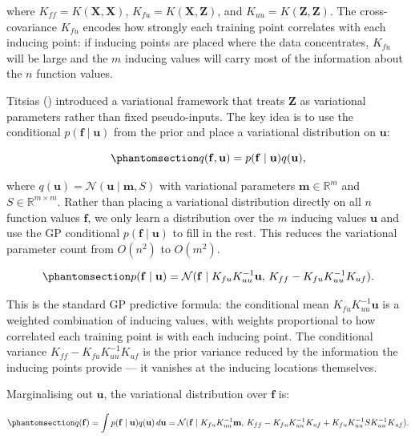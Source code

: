 \documentclass[
  letterpaper,
  DIV=11,
  numbers=noendperiod]{scrartcl}
\begin{document}
where \(K_{ff} = K(\mathbf{X}, \mathbf{X})\),
\(K_{fu} = K(\mathbf{X}, \mathbf{Z})\), and
\(K_{uu} = K(\mathbf{Z}, \mathbf{Z})\). The cross-covariance \(K_{fu}\)
encodes how strongly each training point correlates with each inducing
point: if inducing points are placed where the data concentrates,
\(K_{fu}\) will be large and the \(m\) inducing values will carry most
of the information about the \(n\) function values.

Titsias () introduced a
variational framework that treats \(\mathbf{Z}\) as variational
parameters rather than fixed pseudo-inputs. The key idea is to use the
conditional \(p(\mathbf{f} \mid \mathbf{u})\) from the prior and place a
variational distribution on \(\mathbf{u}\):

\begin{equation}\phantomsection\label{eq-sparse_variational_form}{
q(\mathbf{f}, \mathbf{u}) = p(\mathbf{f} \mid \mathbf{u}) q(\mathbf{u}),
}\end{equation}

where \(q(\mathbf{u}) = \mathcal{N}(\mathbf{u} \mid \mathbf{m}, S)\)
with variational parameters \(\mathbf{m} \in \mathbb{R}^m\) and
\(S \in \mathbb{R}^{m \times m}\). Rather than placing a variational
distribution directly on all \(n\) function values \(\mathbf{f}\), we
only learn a distribution over the \(m\) inducing values \(\mathbf{u}\)
and use the GP conditional \(p(\mathbf{f} \mid \mathbf{u})\) to fill in
the rest. This reduces the variational parameter count from \(O(n^2)\)
to \(O(m^2)\).

\begin{equation}\phantomsection\label{eq-conditional_f_given_u}{
p(\mathbf{f} \mid \mathbf{u}) = \mathcal{N}(\mathbf{f} \mid K_{fu} K_{uu}^{-1} \mathbf{u}, \, K_{ff} - K_{fu} K_{uu}^{-1} K_{uf}).
}\end{equation}

This is the standard GP predictive formula: the conditional mean
\(K_{fu}K_{uu}^{-1}\mathbf{u}\) is a weighted combination of inducing
values, with weights proportional to how correlated each training point
is with each inducing point. The conditional variance
\(K_{ff} - K_{fu}K_{uu}^{-1}K_{uf}\) is the prior variance reduced by
the information the inducing points provide --- it vanishes at the
inducing locations themselves.

Marginalising out \(\mathbf{u}\), the variational distribution over
\(\mathbf{f}\) is:

\begin{equation}\phantomsection\label{eq-marginal_q_f}{
q(\mathbf{f}) = \int p(\mathbf{f} \mid \mathbf{u}) q(\mathbf{u}) \, d\mathbf{u} = \mathcal{N}(\mathbf{f} \mid K_{fu} K_{uu}^{-1} \mathbf{m}, \, K_{ff} - K_{fu} K_{uu}^{-1} K_{uf} + K_{fu} K_{uu}^{-1} S K_{uu}^{-1} K_{uf}).
}\end{equation}
\end{document}
